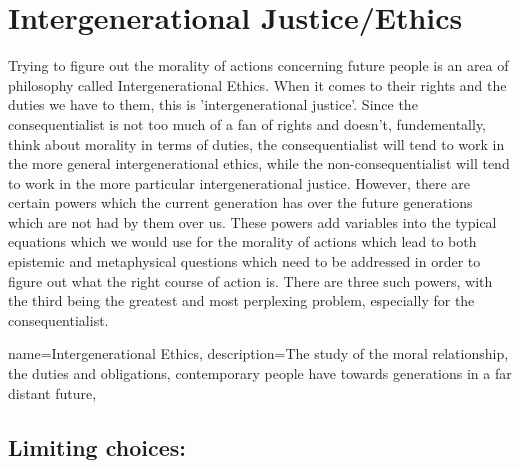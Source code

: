 \section{Intergenerational Justice/Ethics}

Trying to figure out the morality of actions concerning future people is an area of philosophy called \gls{Intergenerational Ethics}. When it comes to their rights and the duties we have to them, this is 'intergenerational justice'. Since the consequentialist is not too much of a fan of rights and doesn't, fundementally, think about morality in terms of duties, the consequentialist will tend to work in the more general intergenerational ethics, while the non-consequentialist will tend to work in the more particular intergenerational justice. However, there are certain powers which the current generation has over the future generations which are not had by them over us. These powers add variables into the typical equations which we would use for the morality of actions which lead to both epistemic and metaphysical questions which need to be addressed in order to figure out what the right course of action is. There are three such powers, with the third being the greatest and most perplexing problem, especially for the consequentialist.

{
  name=Intergenerational Ethics,
  description={The study of the moral relationship, the duties and obligations, contemporary people have towards generations in a far distant future},
}


\subsection{Limiting choices:}

